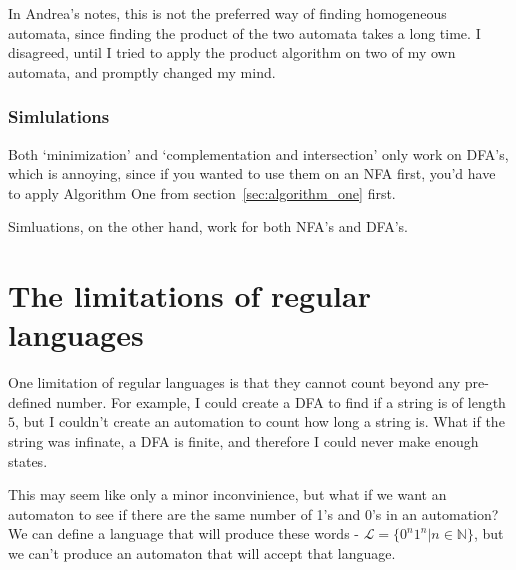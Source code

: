 In Andrea's notes, this is not the preferred way of finding homogeneous
automata, since finding the product of the two automata takes a long time. I
disagreed, until I tried to apply the product algorithm on two of my own
automata, and promptly changed my mind.

\subsubsection{Simlulations}

Both `minimization' and `complementation and intersection' only work on DFA's,
which is annoying, since if you wanted to use them on an NFA first, you'd have
to apply Algorithm One from section~\ref{sec:algorithm_one} first.

Simluations, on the other hand, work for both NFA's and DFA's.


\section{The limitations of regular languages}

One limitation of regular languages is that they cannot count beyond any pre-
defined number. For example, I could create a DFA to find if a string is of
length $5$, but I couldn't create an automation to count how long a string is.
What if the string was infinate, a DFA is finite, and therefore I could never
make enough states.

This may seem like only a minor inconvinience, but what if we want an automaton
to see if there are the same number of 1's and 0's in an automation? We can
define a language that will produce these words - $\mathcal{L} = \{0^n1^n|n \in
\mathbb{N}\}$, but we can't produce an automaton that will accept that language.
